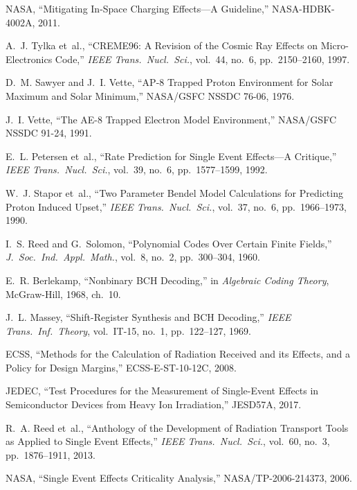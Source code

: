 \documentclass[11pt,a4paper]{article}
\begin{document}
\begin{enumerate}[label={[\arabic*]}]
    \item NASA, ``Mitigating In-Space Charging Effects---A Guideline,'' NASA-HDBK-4002A, 2011.
    \item A.~J. Tylka et~al., ``CREME96: A Revision of the Cosmic Ray Effects on Micro-Electronics Code,'' \textit{IEEE Trans.\ Nucl.\ Sci.}, vol.~44, no.~6, pp.~2150--2160, 1997.
    \item D.~M. Sawyer and J.~I. Vette, ``AP-8 Trapped Proton Environment for Solar Maximum and Solar Minimum,'' NASA/GSFC NSSDC 76-06, 1976.
    \item J.~I. Vette, ``The AE-8 Trapped Electron Model Environment,'' NASA/GSFC NSSDC 91-24, 1991.
    \item E.~L. Petersen et~al., ``Rate Prediction for Single Event Effects---A Critique,'' \textit{IEEE Trans.\ Nucl.\ Sci.}, vol.~39, no.~6, pp.~1577--1599, 1992.
    \item W.~J. Stapor et~al., ``Two Parameter Bendel Model Calculations for Predicting Proton Induced Upset,'' \textit{IEEE Trans.\ Nucl.\ Sci.}, vol.~37, no.~6, pp.~1966--1973, 1990.
    \item I.~S. Reed and G.~Solomon, ``Polynomial Codes Over Certain Finite Fields,'' \textit{J.\ Soc.\ Ind.\ Appl.\ Math.}, vol.~8, no.~2, pp.~300--304, 1960.
    \item E.~R. Berlekamp, ``Nonbinary BCH Decoding,'' in \textit{Algebraic Coding Theory}, McGraw-Hill, 1968, ch.~10.
    \item J.~L. Massey, ``Shift-Register Synthesis and BCH Decoding,'' \textit{IEEE Trans.\ Inf.\ Theory}, vol.~IT-15, no.~1, pp.~122--127, 1969.
    \item ECSS, ``Methods for the Calculation of Radiation Received and its Effects, and a Policy for Design Margins,'' ECSS-E-ST-10-12C, 2008.
    \item JEDEC, ``Test Procedures for the Measurement of Single-Event Effects in Semiconductor Devices from Heavy Ion Irradiation,'' JESD57A, 2017.
    \item R.~A. Reed et~al., ``Anthology of the Development of Radiation Transport Tools as Applied to Single Event Effects,'' \textit{IEEE Trans.\ Nucl.\ Sci.}, vol.~60, no.~3, pp.~1876--1911, 2013.
    \item NASA, ``Single Event Effects Criticality Analysis,'' NASA/TP-2006-214373, 2006.
\end{enumerate}
\end{document}
